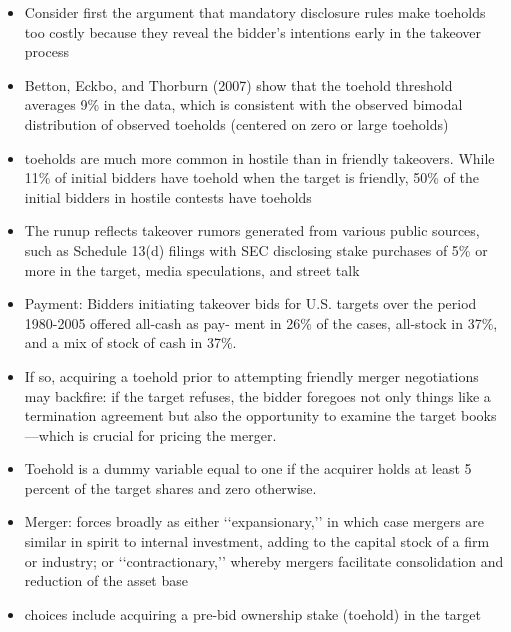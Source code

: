 \documentclass[12pt]{article}
\begin{document}
\begin{itemize}
        \item Consider first the argument that mandatory disclosure rules make toeholds too costly because they reveal the bidder’s intentions early in the takeover process \citep{Mitchell2011}

        \item Betton, Eckbo, and Thorburn (2007) show that the toehold threshold averages 9\% in the data, which is consistent with the observed bimodal distribution of observed toeholds (centered on zero or large toeholds) \citep{Mitchell2011}

        \item toeholds are much more common in hostile than in friendly takeovers. While 11\% of initial bidders have toehold when the target is friendly, 50\% of the initial bidders in hostile contests have toeholds \citep{Mitchell2011}

        \item The runup reflects takeover rumors generated from various public sources, such as Schedule 13(d) filings with SEC disclosing stake purchases of 5\% or more in the target, media speculations, and street talk \citep{Mitchell2011}

        \item Payment: Bidders initiating takeover bids for U.S. targets over the period 1980-2005 offered all-cash as pay- ment in 26\% of the cases, all-stock in 37\%, and a mix of stock of cash in 37\%. \citep{Mitchell2011}

        \item If so, acquiring a toehold prior to attempting friendly merger negotiations may backfire: if the target refuses, the bidder foregoes not only things like a termination agreement but also the opportunity to examine the target books—which is crucial for pricing the merger. \citep{Mitchell2011}

        \item Toehold is a dummy variable equal to one if the acquirer holds at least 5 percent of the target shares and zero otherwise. \citep{Moeller2004}

        \item Merger: forces broadly as either ‘‘expansionary,’’ in which case mergers are similar in spirit to internal investment, adding to the capital stock of a firm or industry; or ‘‘contractionary,’’ whereby mergers facilitate consolidation and reduction of the asset base \citep{Andrade2004}

        \item choices include acquiring a pre-bid ownership stake (toehold) in the target \citep{Eckbo2009}


\end{itemize}
\end{document}
